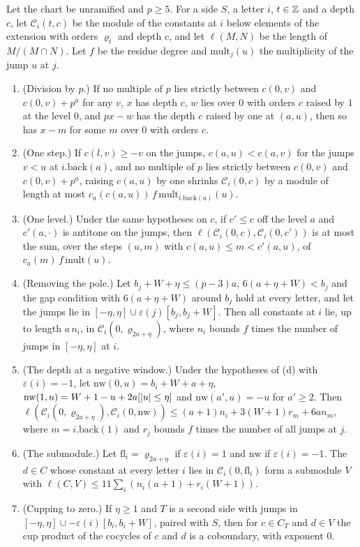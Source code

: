 \begin{lemma}\label{lem:few-low-jumps}
Let the chart be unramified and $p\ge5$. For a side $S$, a letter $i$, $t\in\mathbb{Z}$ and a depth $c$, let $\mathcal C_i(t,c)$ be the module of the constants at $i$ below elements of the extension with orders $\varrho_t$ and depth $c$, and let $\ell(M,N)$ be the length of $M/(M\cap N)$. Let $f$ be the residue degree and
$\mathrm{mult}_j(u)$ the multiplicity of the jump $u$ at $j$.
\begin{enumerate}[label=\textup{(\alph*)}]
\item (Division by $p$.) If no multiple of $p$ lies strictly between $c(0,v)$ and $c(0,v)+p^a$ for any $v$, $x$ has depth $c$, $w$ lies over $0$ with orders $c$ raised by $1$ at the level $0$, and $px-w$ has the depth $c$ raised by one at $(a,u)$, then so has $x-m$ for some $m$ over $0$ with orders $c$.
\item (One step.) If $c(l,v)\ge-v$ on the jumps, $c(a,u)<c(a,v)$ for the jumps $v<u$ at $i.\mathrm{back}(a)$, and no multiple of $p$ lies strictly between $c(0,v)$ and $c(0,v)+p^a$, raising $c(a,u)$ by one shrinks $\mathcal C_i(0,c)$ by a module of length at most $c_a(c(a,u))\,f\,\mathrm{mult}_{i.\mathrm{back}(a)}(u)$.
\item (One level.) Under the same hypotheses on $c$, if $c'\le c$ off the level $a$ and $c'(a,\cdot)$ is antitone on the jumps, then $\ell(\mathcal C_i(0,c),\mathcal C_i(0,c'))$ is at most the sum, over the steps $(u,m)$ with $c(a,u)\le m<c'(a,u)$, of $c_a(m)\,f\,\mathrm{mult}(u)$.
\item (Removing the pole.) Let $b_j+W+\eta\le(p-3)a$, $6(a+\eta+W)<b_j$ and the gap condition with $6(a+\eta+W)$ around $b_j$ hold at every letter, and let the jumps lie in $[-\eta,\eta]\cup\varepsilon(j)[b_j,b_j+W]$. Then all constants at $i$ lie, up to length $a\,n_i$, in $\mathcal C_i(0,\varrho_{2a+\eta})$, where $n_i$
bounds $f$ times the number of jumps in $[-\eta,\eta]$ at $i$.
\item (The depth at a negative window.) Under the hypotheses of (d) with $\varepsilon(i)=-1$, let $\mathrm{nw}(0,u)=b_i+W+a+\eta$, $\mathrm{nw}(1,u)=W+1-u+2a[\lvert u\rvert\le\eta]$ and $\mathrm{nw}(a',u)=-u$ for $a'\ge2$. Then $\ell(\mathcal C_i(0,\varrho_{2a+\eta}),\mathcal C_i(0,\mathrm{nw}))\le(a+1)n_i+3(W+1)r_m+6an_m$, where $m=i.\mathrm{back}(1)$ and $r_j$ bounds $f$ times the number of all jumps at $j$.
\item (The submodule.) Let $\mathrm{fl}_i=\varrho_{2a+\eta}$ if $\varepsilon(i)=1$ and $\mathrm{nw}$ if $\varepsilon(i)=-1$. The $d\in C$ whose constant at every letter $i$ lies in $\mathcal C_i(0,\mathrm{fl}_i)$ form a submodule $V$ with $\ell(C,V)\le11\sum_i(n_i(a+1)+r_i(W+1))$.
\item (Cupping to zero.) If $\eta\ge1$ and $T$ is a second side with jumps in $[-\eta,\eta]\cup-\varepsilon(i)[b_i,b_i+W]$, paired with $S$, then for $c\in C_T$ and $d\in V$ the cup product of the cocycles of $c$ and $d$ is a coboundary, with exponent $0$.
\end{enumerate}
\end{lemma}

